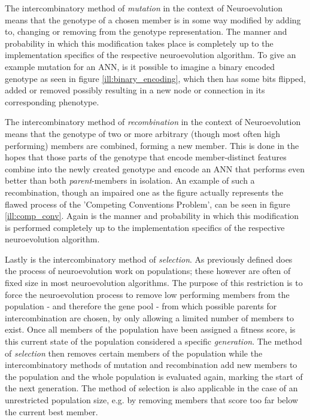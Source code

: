 \documentclass[journal, a4paper]{IEEEtran}
\begin{document}
The intercombinatory method of \textit{mutation} in the context of Neuroevolution means that the genotype of a chosen member is in some way modified by adding to, changing or removing from the genotype representation. The manner and probability in which this modification takes place is completely up to the implementation specifics of the respective neuroevolution algorithm. To give an example mutation for an ANN, is it possible to imagine a binary encoded genotype as seen in figure \ref{ill:binary_encoding}, which then has some bits flipped, added or removed possibly resulting in a new node or connection in its corresponding phenotype.

The intercombinatory method of \textit{recombination} in the context of Neuroevolution means that the genotype of two or more arbitrary (though most often high performing) members are combined, forming a new member. This is done in the hopes that those parts of the genotype that encode member-distinct features combine into the newly created genotype and encode an ANN that performs even better than both \textit{parent}-members in isolation. An example of such a recombination, though an impaired one as the figure actually represents the flawed process of the 'Competing Conventions Problem', can be seen in figure \ref{ill:comp_conv}. Again is the manner and probability in which this modification is performed completely up to the implementation specifics of the respective neuroevolution algorithm.

Lastly is the intercombinatory method of \textit{selection}. As previously defined does the process of neuroevolution work on populations; these however are often of fixed size in most neuroevolution algorithms. The purpose of this restriction is to force the neuroevolution process to remove low performing members from the population - and therefore the gene pool - from which possible parents for intercombination are chosen, by only allowing a limited number of members to exist. Once all members of the population have been assigned a fitness score, is this current state of the population considered a specific \textit{generation}. The method of \textit{selection} then removes certain members of the population while the intercombinatory methods of mutation and recombination add new members to the population and the whole population is evaluated again, marking the start of the next generation. The method of selection is also applicable in the case of an unrestricted population size, e.g. by removing members that score too far below the current best member.
\end{document}

